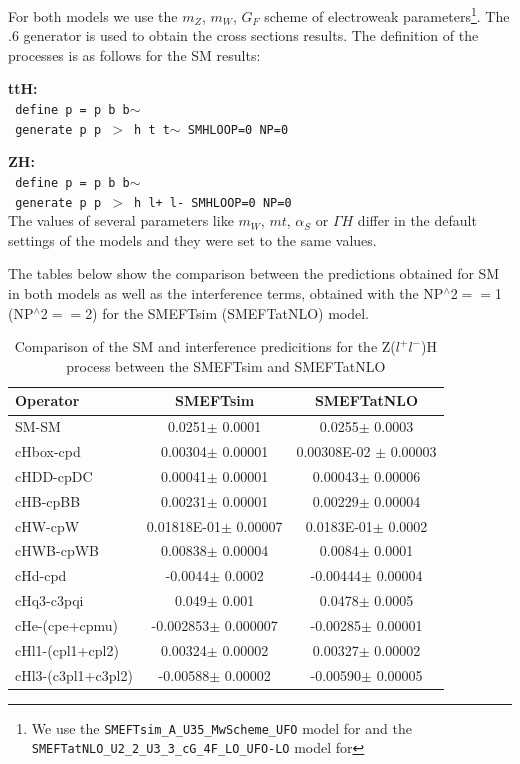 For both models we use the $m_Z$, $m_W$, $G_F$ scheme of electroweak parameters\footnote{We use the \texttt{SMEFTsim\_A\_U35\_MwScheme\_UFO} model for \SMEFTsim and the \texttt{SMEFTatNLO\_U2\_2\_U3\_3\_cG\_4F\_LO\_UFO-LO} model for \SMEFTatNLO}. The .6 generator is used to obtain the cross sections results. The definition of the processes is as follows for the SM results:

\noindent
{\bf ttH:}\\
\noindent
  \texttt{ define p = p b b$\sim$ }\\
  \texttt{ generate p p $>$ h t t$\sim$ SMHLOOP=0 NP=0 }

\noindent
{\bf ZH:}\\
  \noindent
  \texttt{ define p = p b b$\sim$} \\
  \texttt{ generate p p $>$ h l+ l- SMHLOOP=0  NP=0     }\\
  
  The values of several parameters like $m_W$, $mt$, $\alpha_S$ or $\Gamma H$ differ in the default settings of the models and they were set to the same values.

  The tables below show the comparison between the predictions obtained for SM in both models as well as the interference terms, obtained with the NP$^{\wedge}$2$==$1 (NP$^{\wedge}$2$==$2)  for the SMEFTsim (SMEFTatNLO) model.


\begin{table}[h]
\begin{tabular}{|l|c|c|}
\hline
\textbf{Operator} & \textbf{SMEFTsim} & \textbf{SMEFTatNLO} \\
 \hline
 SM-SM & 0.0251$\pm$ 0.0001& 0.0255$\pm$ 0.0003\\
  \hline
cHbox-cpd & 0.00304$\pm$ 0.00001& 0.00308E-02 $\pm$ 0.00003\\
 \hline
cHDD-cpDC & 0.00041$\pm$ 0.00001& 0.00043$\pm$ 0.00006\\
\hline
cHB-cpBB & 0.00231$\pm$ 0.00001& 0.00229$\pm$ 0.00004\\
 \hline
cHW-cpW & 0.01818E-01$\pm$ 0.00007& 0.0183E-01$\pm$ 0.0002\\
 \hline
cHWB-cpWB & 0.00838$\pm$ 0.00004& 0.0084$\pm$ 0.0001\\
 \hline
cHd-cpd &-0.0044$\pm$ 0.0002 & -0.00444$\pm$ 0.00004\\
 \hline
cHq3-c3pqi & 0.049$\pm$ 0.001& 0.0478$\pm$ 0.0005\\
\hline
cHe-(cpe+cpmu) &-0.002853$\pm$ 0.000007& -0.00285$\pm$ 0.00001\\
 \hline
cHl1-(cpl1+cpl2) & 0.00324$\pm$ 0.00002 & 0.00327$\pm$ 0.00002\\
\hline
cHl3-(c3pl1+c3pl2) & -0.00588$\pm$ 0.00002& -0.00590$\pm$ 0.00005\\

\end{tabular}
\caption{ Comparison of the SM and interference predicitions for the Z($l^{+}l^{-}$)H process between the SMEFTsim and SMEFTatNLO}

\end{table}







